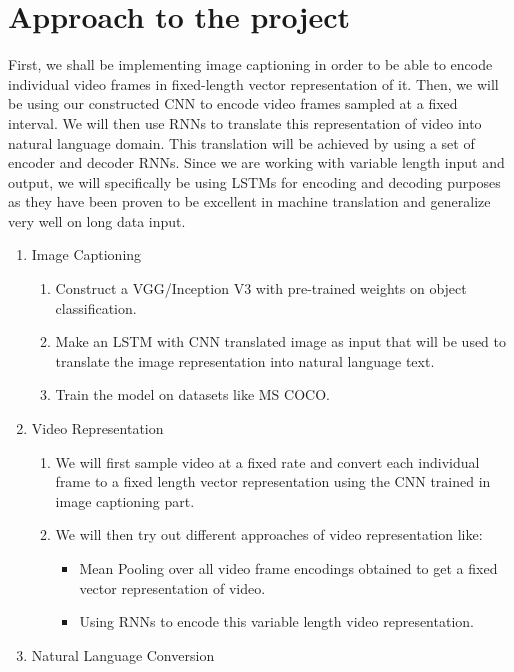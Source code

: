 \documentclass{article}
\begin{document}
	\section{Approach to the project}
		First, we shall be implementing image captioning in order to be able to encode individual video frames in fixed-length vector representation of it.
		Then, we will be using our constructed CNN to encode video frames sampled at a fixed interval.
		We will then use RNNs to translate this representation of video into natural language domain. This translation will be achieved by using a set of encoder and decoder RNNs. Since we are working with variable length input and output, we will specifically be using LSTMs for encoding and decoding purposes as they have been proven to be excellent in machine translation and generalize very well on long data input.
		\begin{enumerate}
			\item Image Captioning
			\begin{enumerate}
				\item
					Construct a VGG/Inception V3 with pre-trained weights on object classification.
				\item
					Make an LSTM\cite{showandtell} with CNN translated image as input that will be used to translate the image representation into natural language text.
				\item
					Train the model on datasets like MS COCO.
			\end{enumerate}
			\item Video Representation
			\begin{enumerate}
				\item
					We will first sample video at a fixed rate and convert each individual frame to a fixed length vector representation using the CNN trained in image captioning part.
				\item
					We will then try out different approaches of video representation like:
					\begin{itemize}
						\item
							Mean Pooling\cite{proposal} over all video frame encodings obtained to get a fixed vector representation of video.
						\item
							Using RNNs\cite{s2vt} to encode this variable length video representation.
					\end{itemize}					
			\end{enumerate}
			\item Natural Language Conversion
			\begin{enumerate}

\end{enumerate}
\end{enumerate}
\end{document}
